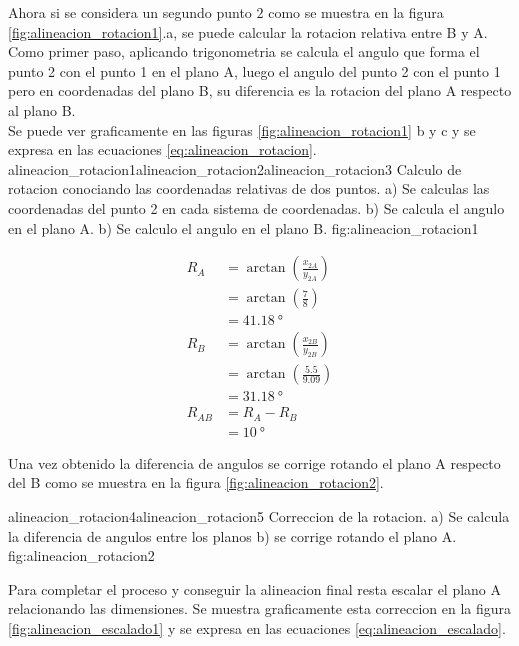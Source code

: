          Ahora si se considera un segundo punto $2$ como se muestra en la figura \ref{fig:alineacion_rotacion1}.a, se puede calcular la rotacion relativa entre B y A.\\
         Como primer paso, aplicando trigonometria se calcula el angulo que forma el punto 2 con el punto 1 en el plano A, luego el angulo del punto 2 con el punto 1 pero en coordenadas del plano B, su diferencia es la rotacion del plano A respecto al plano B.\\
         Se puede ver graficamente en las figuras \ref{fig:alineacion_rotacion1} b y c y se expresa en las ecuaciones \ref{eq:alineacion_rotacion}.
         {alineacion_rotacion1}{alineacion_rotacion2}{alineacion_rotacion3}
         {Calculo de rotacion conociando las coordenadas relativas de dos puntos. a) Se calculas las coordenadas del punto 2 en cada sistema de coordenadas. b) Se calcula el angulo en el plano A. b) Se calculo el angulo en el plano B.}
         {fig:alineacion_rotacion1}


         \begin{equation}
            \begin{aligned}
               R_A &= \arctan(\frac{x_{2A}}{y_{2A}}) \\
                  &= \arctan(\frac{7}{8}) \\
                  &= \SI{41.18}{\degree}\\
              R_B &= \arctan(\frac{x_{2B}}{y_{2B}})\\
                  &= \arctan(\frac{5.5}{9.09}) \\
                  &= \SI{31.18}{\degree}\\
           R_{AB} &= R_A - R_B\\
                      &= \SI{10}{\degree}
            \end{aligned}
            \label{eq:alineacion_rotacion}
         \end{equation}

         Una vez obtenido la diferencia de angulos se corrige rotando el plano A respecto del B como se muestra en la figura \ref{fig:alineacion_rotacion2}.

         {alineacion_rotacion4}{alineacion_rotacion5}
         {Correccion de la rotacion. a) Se calcula la diferencia de angulos entre los planos b) se corrige rotando el plano A.}
         {fig:alineacion_rotacion2}

         Para completar el proceso y conseguir la alineacion final resta escalar el plano A relacionando las dimensiones. Se muestra graficamente esta correccion en la figura \ref{fig:alineacion_escalado1} y se expresa en las ecuaciones  \ref{eq:alineacion_escalado}.

